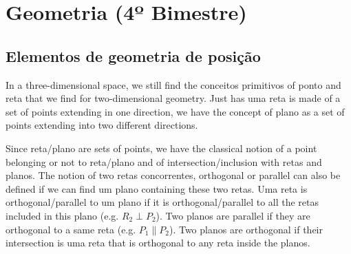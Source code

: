 \chapter{Geometria (4º Bimestre)}

\section{Elementos de geometria de posição}

In a three-dimensional space, we still find the conceitos primitivos of
ponto and reta that we find for two-dimensional geometry. Just has uma reta
is made of a set of points extending in one direction, we have the concept
of plano as a set of points extending into two different directions.

\begin{center}
\end{center}

Since reta/plano are sets of points, we have the classical notion of a point
belonging or not to reta/plano and of intersection/inclusion with retas and
planos. The notion of two retas concorrentes, orthogonal or parallel can also
be defined if we can find um plano containing these two retas.
Uma reta is orthogonal/parallel to um plano if it is orthogonal/parallel to
all the retas included in this plano (e.g. $R_2 \perp P_2$). Two planos
are parallel if they are orthogonal to a same reta (e.g. $P_1 \parallel P_2$).
Two planos are orthogonal if their intersection is
uma reta that is orthogonal to any reta inside the planos.

\begin{center}
\end{center}

